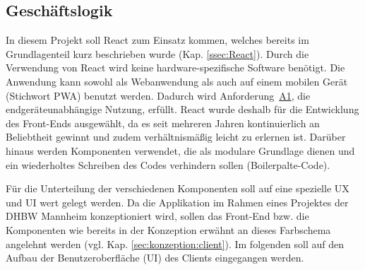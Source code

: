 
\subsection{Geschäftslogik}
\label{ssec:GeschaeftslogikClient}

In diesem Projekt soll React zum Einsatz kommen, welches bereits im Grundlagenteil kurz beschrieben wurde (Kap. \vref{ssec:React}).
Durch die Verwendung von React wird keine hardware-spezifische Software benötigt.
Die Anwendung kann sowohl als Webanwendung als auch auf einem mobilen Gerät (Stichwort \ac{PWA}) benutzt werden.
Dadurch wird Anforderung~\hyperref[Anf:A1]{A1}, die endgeräteunabhängige Nutzung, erfüllt.
React wurde \ua deshalb für die Entwicklung des Front-Ends ausgewählt, da es seit mehreren Jahren kontinuierlich an Beliebtheit gewinnt\autocite[vgl.][]{stacoverflow_Top_Frameworks} und zudem verhältnismäßig leicht zu erlernen ist.
Darüber hinaus werden Komponenten verwendet, die als modulare Grundlage dienen und ein wiederholtes Schreiben des Codes verhindern sollen (Boilerpalte-Code).

Für die Unterteilung der verschiedenen Komponenten soll auf eine spezielle \ac{UX} und \ac{UI} wert gelegt werden.
Da die Applikation im Rahmen eines Projektes der DHBW Mannheim konzeptioniert wird, sollen das Front-End bzw. die Komponenten wie bereits in der Konzeption erwähnt an dieses Farbschema angelehnt werden (vgl. Kap. \vref{sec:konzeption:client}).
Im folgenden soll auf den Aufbau der Benutzeroberfläche (\ac{UI}) des Clients eingegangen werden.